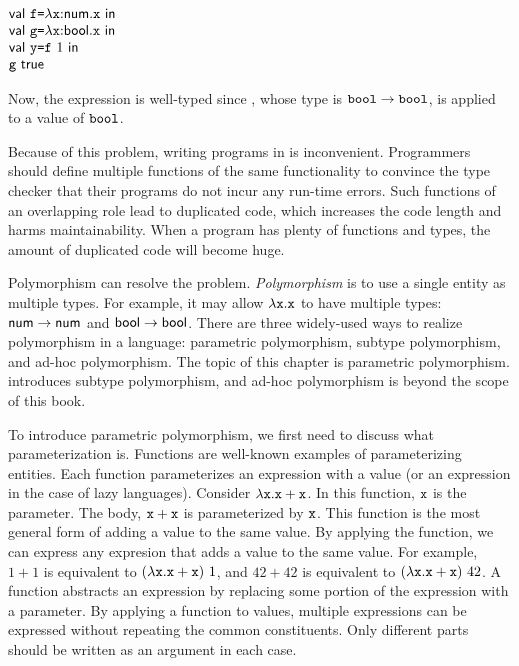 $
  \begin{array}{@{}l}
    \ebind{\cf}{\efunt{\cx}{\tnum}{\cx}}{\\
    \ebind{\code{g}}{\efunt{\cx}{\tbool}{\cx}}{\\
    \ebind{\cy}{\cf\ 1}{\\
    \code{g}\ \textsf{true}
    }}}
  \end{array}
$

Now, the expression is well-typed since , whose type is
$\texttt{bool}\rightarrow\texttt{bool}$, is applied to a value of $\texttt{bool}$.

Because of this problem, writing programs in \plang is inconvenient. Programmers
should define multiple functions of the same functionality to convince the type
checker that their programs do not incur any run-time errors. Such functions of
an overlapping role lead to duplicated code, which increases the code length and
harms maintainability. When a program has plenty of functions and types, the
amount of duplicated code will become huge.

Polymorphism can resolve the problem. \textit{Polymorphism}
is to use a single entity as multiple types. For example, it may allow
$\lambda\texttt{x}.\texttt{x}$ to have multiple types: $\textsf{num}\rightarrow\textsf{num}$ and
$\textsf{bool}\rightarrow\textsf{bool}$. There are three widely-used ways to
realize polymorphism in a language: parametric polymorphism, subtype
polymorphism, and ad-hoc polymorphism. The topic of this chapter is parametric
polymorphism.  introduces subtype polymorphism, and
ad-hoc polymorphism is beyond the scope of this book.

To introduce parametric polymorphism, we first need to discuss what
parameterization is. Functions are well-known examples of parameterizing entities.
Each function parameterizes an expression with a value
(or an expression in the case of lazy languages). Consider $\lambda\texttt{x}.\texttt{x}+\texttt{x}$.
In this function, $\texttt{x}$ is the parameter. The body, $\texttt{x}+\texttt{x}$ is parameterized by $\texttt{x}$.
This function is the most general form of adding a value to the same value. By
applying the function, we can express any expresion that adds a value to the
same value. For example, $1+1$ is equivalent to $(\efun{\cx}{\cx+\cx})\ 1$, and
$42+42$ is equivalent to $(\efun{\cx}{\cx+\cx})\ 42$. A function abstracts an
expression by replacing some portion of the expression with a parameter. By
applying a function to values, multiple expressions can be
expressed without repeating the common constituents. Only different parts should
be written as an argument in each case.

